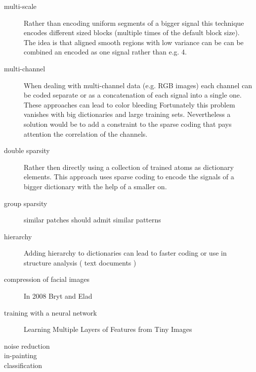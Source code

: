 \begin{description}
\item[multi-scale]
Rather than encoding uniform segments of a bigger signal this technique encodes different sized 
blocks (multiple times of the default block size). The idea is that aligned smooth regions with low variance can be 
can be combined an encoded as one signal rather than e.g. 4. \cite{saprio}

\item[multi-channel]
When dealing with multi-channel data (e.g. RGB images) 
each channel can be coded separate or as a concatenation of each signal into a single one.
These approaches can lead to color bleeding \cite{mairal08sparse} 
Fortunately this problem vanishes with big dictionaries and large training sets. \cite{mairal08sparse}
Nevertheless a solution would be to add a constraint to the sparse coding that pays attention the correlation of the channels.

\item[double sparsity]
Rather then directly using a collection of trained atoms as dictionary elements. This approach uses sparse coding
to encode the signals of a bigger dictionary with the help of a smaller on. \cite{double sparsity} 

\item[group sparsity]
similar patches should admit similar patterns
\cite{double sparsity}

\item[hierarchy]
Adding hierarchy to dictionaries can lead to faster coding or use in structure analysis ( text documents )
\cite{Jenatton2010}

\end{description}



\begin{description}
\item[compression of facial images] In 2008 Bryt and Elad \cite{Bryt2008} 
\item[training with a neural network]
Learning Multiple Layers of Features from Tiny Images \cite{Krizhevsky2009}
\item[noise reduction]
\item[in-painting]
\item[classification] 
\end{description}

